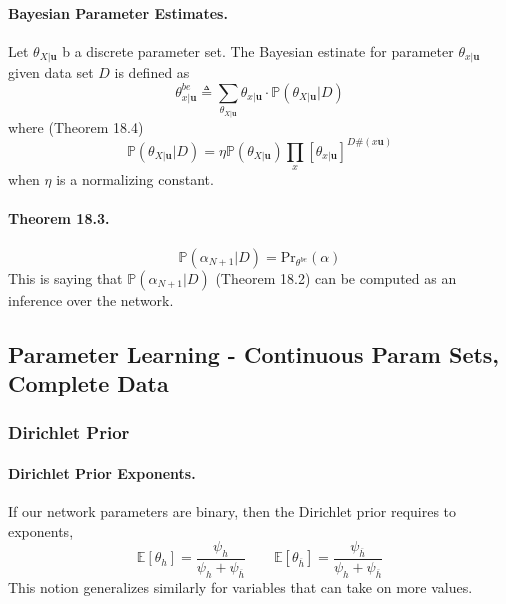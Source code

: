 \documentclass[11pt]{article}
\newcommand{\bu}{\mathbf{u}}
\newcommand{\pr}{\mathrm{Pr}}
\begin{document}
\paragraph{Bayesian Parameter Estimates.} Let $\theta_{X|\bu}$ b a discrete parameter set. The Bayesian estinate for parameter $\theta_{x | \bu}$ given data set $D$ is defined as 
\begin{equation}
	\theta_{x|\bu}^{be} \triangleq \sum_{\theta_{X| \bu}} \theta_{x | \bu} \cdot \mathbb P ( \theta_{X | \bu} | D)
\end{equation}
where (Theorem 18.4)
\begin{equation}
	\mathbb P( \theta_{X | \bu} | D) = \eta \mathbb P (\theta _{X | \bu}) \prod_x \left[ \theta_{x | \bu} \right] ^{D\# (x \bu)}
\end{equation}
when $\eta$ is a normalizing constant. 

\paragraph{Theorem 18.3.}
\begin{equation}
	\mathbb P (\alpha_{N + 1} | D ) = \pr_{\theta^{be}} (\alpha)
\end{equation}
This is saying that $\mathbb P (\alpha _{N + 1} | D)$ (Theorem 18.2) can be computed as an inference over the network. 

\subsection{Parameter Learning - Continuous Param Sets, Complete Data}
\subsubsection{Dirichlet Prior}
\paragraph{Dirichlet Prior Exponents.}
If our network parameters are binary, then the Dirichlet prior requires to exponents, 
\begin{equation}
	\mathbb E [ \theta_h ] = \frac{\psi_h}{\psi_h + \psi_{\overbar h}} \quad \quad 
	\mathbb E [ \theta_{\overbar h} ] = \frac{\psi_{\overbar h}}{\psi_h + \psi_{\overbar h}}
\end{equation}
This notion generalizes similarly for variables that can take on more values. 
\end{document}
